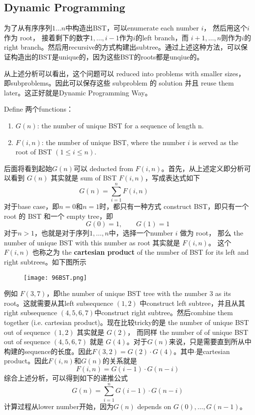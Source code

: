 \subsection{Dynamic Programming}
\begin{CJK*}{UTF8}{gbsn}
为了从有序序列$1\ldots n$中构造出BST，可以enumerate each number $i$， 然后用这个$i$作为 root， 接着剩下的数字$1, \ldots, i-1$作为$i$的left branch，而 $i+1, \ldots, n$则作为$i$的right branch。然后用recursive的方式构建出subtree。通过上述这种方法，可以保证构造出的BST是unique的，因为这些BST的roots都是unqiue的。
\par
从上述分析可以看出，这个问题可以 reduced into problems with smaller sizes，即subproblems。因此可以保存这些 subproblem 的 solution 并且 reuse them later。这正好就是Dynamic Programming Way。
\par
Define 两个functions：
\begin{enumerate}
\item $G(n)$: the number of unique BST for a sequence of length n.
\item $F(i, n)$: the number of unique BST, where the number $i$ is served as the root of BST $(1 \leq i \leq n)$.
\end{enumerate}
后面将看到起始$G(n)$可以 deducted from $F(i, n)$。首先，从上述定义即分析可以看到 $G(n)$ 其实就是 sum of BST $F(i,n)$，写成表达式如下
\[
G(n) = \sum_{i=1}^{n} F(i, n) \qquad \qquad
\]
对于base case，即$n=0$和$n=1$时，都只有一种方式 construct BST，即只有一个 root 的 BST 和一个 empty tree，即
\[
G(0) = 1, \qquad G(1) = 1
\]
对于$n>1$，也就是对于序列$1, \ldots, n$中，选择一个number $i$ 做为 root， 那么 the number of unique BST with this number as root 其实就是 $F(i,n)$。 这个$F(i,n)$ 也称之为 the \textbf{cartesian product} of the number of BST for its left and right subtrees。如下图所示
\begin{figure}[H]
    \centering
    \texttt{[image: 96BST.png]}
\end{figure}
例如 $F(3,7)$，即the number of unique BST tree with the number 3 as its root。这就需要从其left subsequence $(1,2)$ 中construct left subtree，并且从其 right subsequence $(4,5,6,7)$中construct right subtree。然后combine them together (i.e. cartesian product)。现在比较tricky的是 the number of unique BST out of sequence $(1,2)$ 其实就是 $G(2)$， 而同样  the number of of unique BST out of sequence $(4, 5, 6, 7)$ 就是 $G(4)$。对于$G(n)$来说，只是需要直到所从中构建的sequence的长度。因此$F(3,2) = G(2)\cdot G(4)$。其中$\cdot$是cartesian product。因此$F(i,n)$和$G(n)$的关系就是
\[
F(i,n) = G(i-1)\cdot G(n-i)
\]
综合上述分析，可以得到如下的递推公式
\[
G(n) = \sum\limits_{i=1}^{n}G(i-1) \cdot G(n-i)
\]
计算过程从lower number开始，因为$G(n)$ depends on $G(0), \ldots, G(n-1)$。
\end{CJK*}
